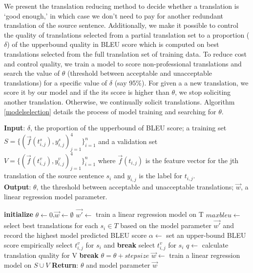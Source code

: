 \documentclass[11pt,letterpaper]{article}
\begin{document}
We present the translation reducing method to decide whether a translation  is `good enough,' in which case we don't need to  pay for another redundant translation of the source sentence. Additionally, we make it possible to control the quality of translations selected from a partial translation set to a proportion ($\delta$) of the upperbound quality in BLEU score which is computed on best translations selected from  the full translation set of training data. To reduce cost and control quality, we train a model to score non-professional translations and search the value of $\theta$ (threshold between acceptable and unacceptable translations) for a specific value of $\delta$ (say 95\%). For given a a new translation, we score it by our model and if the its score is higher than $\theta$, we stop soliciting another translation. Otherwise, we continually solicit translations.  Algorithm \ref{modelselection} details the process of model training and searching for $\theta$. 
\begin{algorithm} [h!]
\caption{}\label{modelselection}
\textbf{Input}: $\delta$, the proportion of the upperbound of BLEU score; a training set $S = \{(\vec f(t^{s}_{i,j}),y^{s}_{i,j})_{j=1}^{4}\}_{i=1}^n$ and a validation set $V = \{(\vec f(t^{v}_{i,j}),y^{v}_{i,j})_{j=1}^{4}\}_{i=1}^n$ where $\vec f(t_{i,j})$ is the feature vector for the jth translation of the source sentence $s_{i}$ and $y_{i,j}$ is the label for $t_{i,j}$.\\
\textbf{Output}: $\theta$, the threshold between acceptable and unacceptable translations; $\vec{w}$, a linear regression model parameter. 
\begin{algorithmic}[1]
\State \textbf{initialize} $\theta \leftarrow 0$,$\vec{w}\leftarrow \emptyset$ 
\State $\vec{w'}\leftarrow$ train a linear regression model on T
\State $maxbleu \leftarrow$ select best translations for each $s_i \in T$ based on the model parameter $\vec{w'}$ and record the highest model predicted BLEU score
\State $\alpha \leftarrow$ set an upper-bound BLEU score empirically
             select $t^{v}_{i,j}$ for $s_i$ and \textbf{break}
\EndIf
{} select $t^{v}_{i,j}$ for $s_i$
\EndIf
\EndFor
\EndFor
\State $q \leftarrow$ calculate translation quality for V
 \textbf{break}
\Else \text{  } $\theta = \theta + stepsize$
\EndIf
\EndWhile
\State $\vec {w} \leftarrow$ train a linear regression model on $S \cup V$
\State \textbf{Return}: $\theta$ and model parameter $\vec{w}$
\end{algorithmic}
\end{algorithm}
\end{document}
